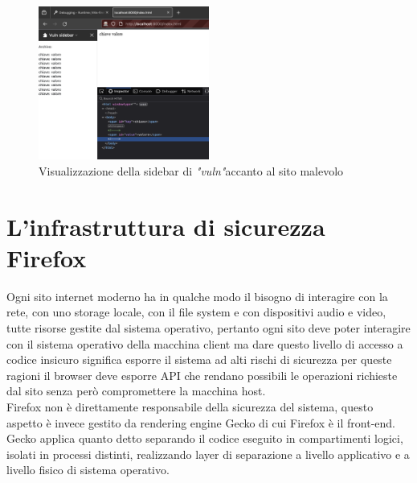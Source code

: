 \documentclass{sapthesis}
\newcommand{\vuln}{\textit{"vuln"}}
\begin{document}
        \begin{figure}[ht]
            \centering                                                  
            \includegraphics[width=0.5\textwidth]{sidebar-screenshot.png}
            \caption{Visualizzazione della sidebar di \vuln accanto al sito malevolo}
            \label{fig:sidebar-screenshot}                             
        \end{figure}
    

\chapter{L'infrastruttura di sicurezza Firefox}
\label{cap:infrastruttura-sicurezza-firefox}
    Ogni sito internet moderno ha in qualche modo il bisogno di interagire con la rete,
    con uno storage locale, con il file system e con dispositivi audio e video, tutte
    risorse gestite dal sistema operativo, pertanto ogni sito deve poter interagire con
    il sistema operativo della macchina client ma dare questo livello di accesso a codice
    insicuro significa esporre il sistema ad alti rischi di sicurezza per queste ragioni
    il browser deve esporre API che rendano possibili le operazioni richieste dal sito
    senza però compromettere la macchina host.\\
    Firefox non è direttamente responsabile della sicurezza del sistema, questo aspetto è
    invece gestito da rendering engine Gecko di cui Firefox è il front-end.
    Gecko applica quanto detto separando il codice eseguito in compartimenti
    logici, isolati in processi distinti, realizzando layer di separazione a livello
    applicativo e a livello fisico di sistema operativo.
\end{document}
